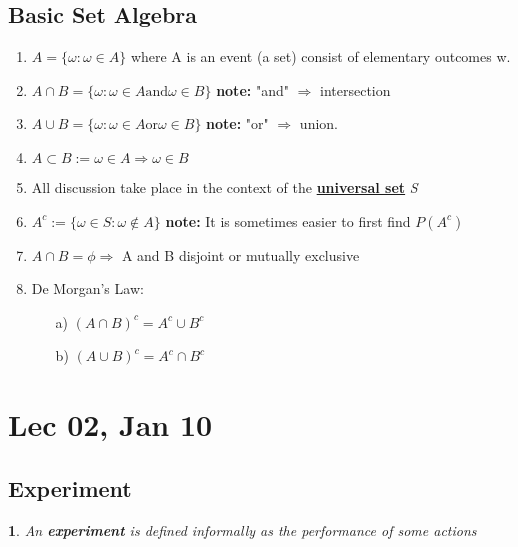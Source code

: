 \documentclass[11pt]{article}
\newtheorem{definition}{\framebox{DEF}}[section]
\newcommand\tab[1][1cm]{\hspace*{#1}}
\begin{document}
        \subsection{Basic Set Algebra}
            \begin{enumerate}
                \item $A = \{\omega : \omega \in A\}$ where A is an event (a set) consist of elementary outcomes w.
                \item $A \cap B = \{\omega: \omega \in A \text{and} \omega \in B\}$ \tab \textbf{note:} "and" $\Rightarrow$ intersection
                \item $A \cup B = \{\omega: \omega \in A \text{or} \omega \in B\}$ \tab \textbf{note:} "or" $\Rightarrow$ union.
                \item $A \subset B:= \omega \in A \Rightarrow \omega \in B$
                \item All discussion take place in the context of the \underline{\textbf{universal set}} \textit{S}
                \item $A^c := \{\omega \in S : \omega \notin A\}$ \tab \textbf{note:} It is sometimes easier to first find $P(A^c)$
                \item $A\cap B = \phi \Rightarrow$ A and B disjoint or mutually exclusive
                \item De Morgan's Law: 
                    \begin{itemize}
                        \item[a)]
                            $ (A\cap B)^c = A^c \cup B^c$
                        \item[b)] 
                            $ (A\cup B)^c = A^c \cap B^c$ 
                    \end{itemize}
            \end{enumerate}
    \newpage
    \section{Lec 02, Jan 10}
            \subsection{Experiment}
                \begin{definition}
                    An \textbf{\textit{experiment}} is defined informally as the performance of some actions
                \end{definition} 
\end{document}
